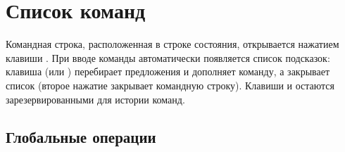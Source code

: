 \documentclass[letterpaper,10pt,russian]{sphinxmanual}
\begin{document}
\sphinxstepscope


\section{Список команд}
\label{\detokenize{cmd_mode:liste-des-commandes}}\label{\detokenize{cmd_mode:cmd-mode}}\label{\detokenize{cmd_mode::doc}}
\sphinxAtStartPar
Командная строка, расположенная в строке состояния, открывается нажатием клавиши . При вводе команды автоматически появляется список подсказок: клавиша  (или ) перебирает предложения и дополняет команду, а  закрывает список (второе нажатие  закрывает командную строку). Клавиши  и  остаются зарезервированными для истории команд.


\subsection{Глобальные операции}
\label{\detokenize{cmd_mode:operations-globales}}\label{\detokenize{cmd_mode:cmd-global}}
\end{document}
